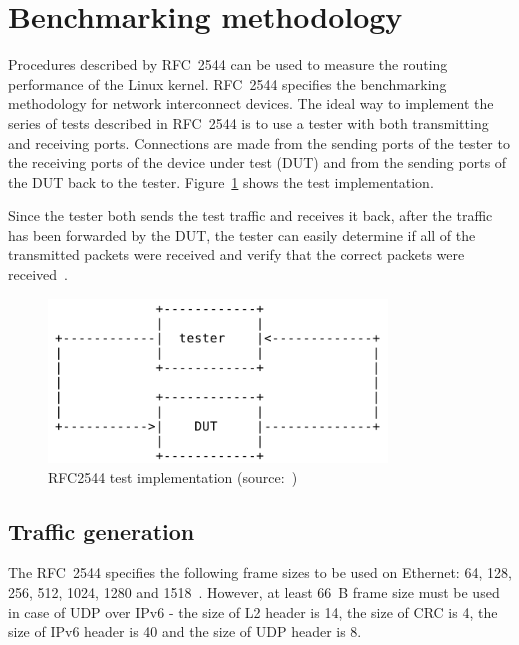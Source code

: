 
\section{Benchmarking methodology}\label{sec:analysis-metodology}
Procedures described by RFC~2544 can be used to measure the routing performance of the Linux kernel.
RFC~2544 specifies the benchmarking methodology for network interconnect devices.
The ideal way to implement the series of tests described in RFC~2544 is to use a tester
with both transmitting and receiving ports.
Connections are made from the sending ports of the tester to the receiving ports of the
device under test (DUT) and from the sending ports of the DUT back to the tester.
Figure~\ref{fig:analysis-rfc2544} shows the test implementation.

Since the tester both sends the test traffic and receives
it back, after the traffic has been forwarded by the DUT, the tester
can easily determine if all of the transmitted packets were received
and verify that the correct packets were received~\cite{rfc2544}.
\begin{figure}
	\centering
	\includegraphics[width=9cm,keepaspectratio]{fig/rfc2544.png}
	\caption{RFC2544 test implementation (source:~\cite{rfc2544})}
	\label{fig:analysis-rfc2544}
\end{figure}

\subsection{Traffic generation}
The RFC~2544 specifies the following frame sizes to be used on Ethernet:
64, 128, 256, 512, 1024, 1280 and 1518~\cite{rfc2544}.
However, at least 66~B frame size must be used in case of UDP over IPv6 - the size of L2 header is 14,
the size of CRC is 4, the size of IPv6 header is 40 and the size of UDP header is 8.

